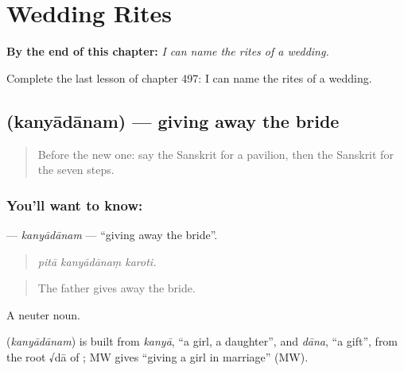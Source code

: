 
\chapter{Wedding Rites}
\label{ch:sa-wedding-rites}

\begin{chapteropening}
\textbf{By the end of this chapter:} \emph{I can name the rites of a wedding.}

Complete the last lesson of chapter 497: I can name the rites of a wedding.
\end{chapteropening}

\section[\texorpdfstring{\sk{कन्यादानम्} (kanyādānam)}{कन्यादानम् (kanyādānam)}]{ (kanyādānam) — giving away the bride}

\label{lesson:SA-C497-kanyadanam}



\begin{quote}
Before the new one: say the Sanskrit for a pavilion, then the Sanskrit for the seven steps.
\end{quote}

\subsection*{You'll want to know: }
\textbf{} — \emph{kanyādānam} — \textquotedblleft{}giving away the bride\textquotedblright{}.

\begin{quote}
  
\end{quote}

\begin{quote}
\emph{pitā kanyādānaṃ karoti.}
\end{quote}

\begin{quote}
The father gives away the bride.
\end{quote}

A neuter noun.

\begin{cousinweb}
\textbf{} (\emph{kanyādānam}) is built from \emph{kanyā}, \textquotedblleft{}a girl, a daughter\textquotedblright{}, and \emph{dāna}, \textquotedblleft{}a gift\textquotedblright{}, from the root √dā of \textbf{}; MW gives \textquotedblleft{}giving a girl in marriage\textquotedblright{} (MW).
\end{cousinweb}

